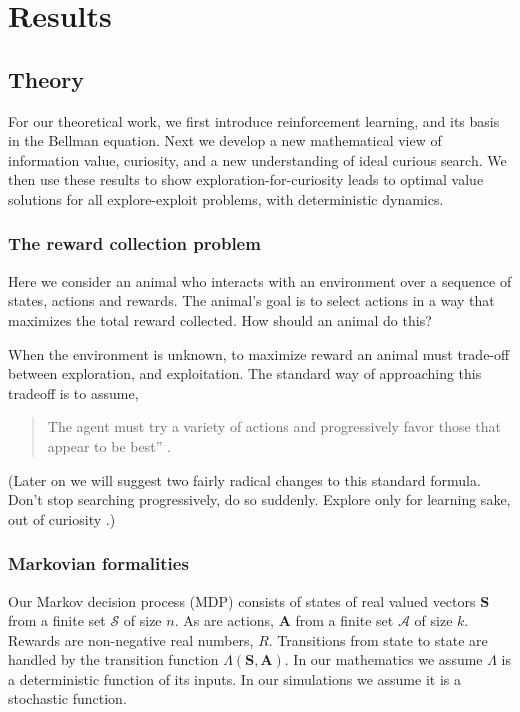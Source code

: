 \section*{Results} 
\subsection*{Theory}
For our theoretical work, we first introduce reinforcement learning, and its basis in the Bellman equation. Next we develop a new mathematical view of information value, curiosity, and a new understanding of ideal curious search. We then use these results to show exploration-for-curiosity leads to optimal value solutions for all explore-exploit problems, with deterministic dynamics.


\subsubsection*{The reward collection problem}
Here we consider an animal who interacts with an environment over a sequence of states, actions and rewards. The animal's goal is to select actions in a way that maximizes the total reward collected. How should an animal do this? 

When the environment is unknown, to maximize reward an animal must trade-off between exploration, and exploitation. The standard way of approaching this tradeoff is to assume, 

\begin{quote}
The agent must try a variety of actions and progressively favor those that appear to be best'' \cite{Sutton2018}. 
\end{quote}

(Later on we will suggest two fairly radical changes to this standard formula. Don’t stop searching progressively, do so suddenly. Explore only for learning sake, out of curiosity \citep{Kidd2015}.)


\subsubsection*{Markovian formalities}
Our Markov decision process (MDP) consists of states of real valued vectors $\mathbf{S}$ from a finite set $\mathcal{S}$ of size $n$. As are actions, $\mathbf{A}$ from a finite set $\mathcal{A}$ of size $k$. Rewards are non-negative real numbers, $R$. Transitions from state to state are handled by the transition function $\Lambda(\mathbf{S},\mathbf{A})$. In our mathematics we assume $\Lambda$ is a deterministic function of its inputs. In our simulations we assume it is a stochastic function.


